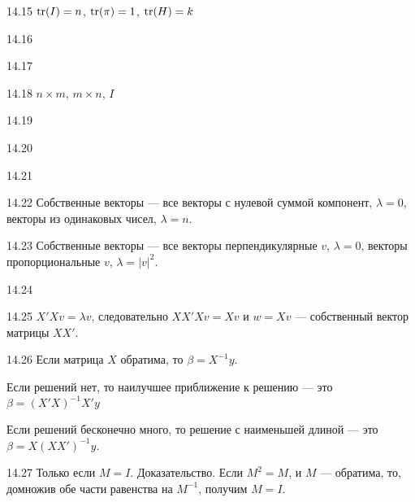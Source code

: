 \protect \hypertarget {soln:14.15}{}
\begin{solution}{{14.15}}
$\operatorname{tr}(I)=n$, $\operatorname{tr}(\pi)=1$, $\operatorname{tr}(H)=k$
\end{solution}
\protect \hypertarget {soln:14.16}{}
\begin{solution}{{14.16}}
\end{solution}
\protect \hypertarget {soln:14.17}{}
\begin{solution}{{14.17}}
\end{solution}
\protect \hypertarget {soln:14.18}{}
\begin{solution}{{14.18}}
$n\times m$, $m\times n$, $I$
\end{solution}
\protect \hypertarget {soln:14.19}{}
\begin{solution}{{14.19}}
\end{solution}
\protect \hypertarget {soln:14.20}{}
\begin{solution}{{14.20}}
\end{solution}
\protect \hypertarget {soln:14.21}{}
\begin{solution}{{14.21}}
\end{solution}
\protect \hypertarget {soln:14.22}{}
\begin{solution}{{14.22}}
Собственные векторы — все векторы с нулевой суммой компонент, $\lambda=0$, векторы из одинаковых чисел, $\lambda=n$.
\end{solution}
\protect \hypertarget {soln:14.23}{}
\begin{solution}{{14.23}}
Собственные векторы — все векторы перпендикулярные $v$, $\lambda=0$, векторы пропорциональные $v$, $\lambda=|v|^2$.
\end{solution}
\protect \hypertarget {soln:14.24}{}
\begin{solution}{{14.24}}
\end{solution}
\protect \hypertarget {soln:14.25}{}
\begin{solution}{{14.25}}
$X'Xv=\lambda v$, следовательно $XX'Xv=Xv$ и $w=Xv$ — собственный вектор матрицы $XX'$.
\end{solution}
\protect \hypertarget {soln:14.26}{}
\begin{solution}{{14.26}}
Если матрица $X$ обратима, то $\beta = X^{-1}y$.

Если решений нет, то наилучшее приближение к решению — это $\beta = (X'X)^{-1}X'y$

Если решений бесконечно много, то решение с наименьшей длиной — это $\beta=X(XX')^{-1}y$.
\end{solution}
\protect \hypertarget {soln:14.27}{}
\begin{solution}{{14.27}}
  Только если $M=I$. Доказательство. Если $M^2=M$, и $M$ — обратима, то, домножив обе части равенства на $M^{-1}$, получим $M=I$.
\end{solution}
